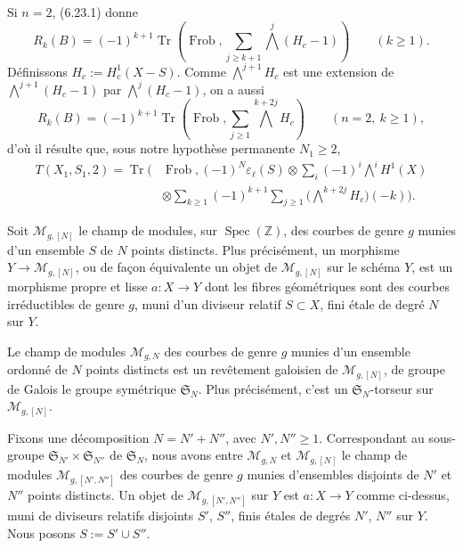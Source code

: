 \documentclass[10pt]{article}
\newcommand{\Z}{\mathbb Z}
\newcommand{\Spec}{\operatorname{Spec}}
\newcommand{\Frob}{\operatorname{Frob}}
\newcommand{\Tr}{\operatorname{Tr}}
\theoremstyle{deligne}
\newcommand{\heading}[1]{\vspace{0.7em}\noindent{\bfseries #1}\quad}
\begin{document}
\heading{Exemple 6.26.} Si $n=2$, (6.23.1) donne
\[
R_k(B)=(-1)^{k+1}\Tr\left(\Frob,\sum_{j\ge k+1}\bigwedge^j(H_c-1)\right)\qquad(k\ge1).
\]
Définissons $H_c:=H^1_c(X-S)$. Comme $\bigwedge^{j+1}H_c$ est une extension de $\bigwedge^{j+1}(H_c-1)$ par $\bigwedge^j(H_c-1)$, on a aussi
\begin{equation}\tag{6.26.1}
R_k(B)=(-1)^{k+1}\Tr\left(\Frob,\sum_{j\ge1}\bigwedge^{k+2j}H_c\right)\qquad(n=2,\ k\ge1),
\end{equation}
d'où il résulte que, sous notre hypothèse permanente $N_1\ge2$,
\begin{equation}\tag{6.26.2}
\begin{aligned}
T(X_1,S_1,2)=\Tr\Bigg(&\Frob,(-1)^N\varepsilon_\ell(S)\otimes
\sum_i(-1)^i\bigwedge^iH^1(X)\\
&\otimes\sum_{k\ge1}(-1)^{k+1}\sum_{j\ge1}\bigl(\bigwedge^{k+2j}H_c\bigr)(-k)\Bigg).
\end{aligned}
\end{equation}

\heading{6.27.} Soit $\mathcal M_{g,[N]}$ le champ de modules, sur $\Spec(\Z)$, des courbes de genre $g$ munies d'un ensemble $S$ de $N$ points distincts. Plus précisément, un morphisme $Y\to\mathcal M_{g,[N]}$, ou de façon équivalente un objet de $\mathcal M_{g,[N]}$ sur le schéma $Y$, est un morphisme propre et lisse $a:X\to Y$ dont les fibres géométriques sont des courbes irréductibles de genre $g$, muni d'un diviseur relatif $S\subset X$, fini \'{e}tale de degré $N$ sur $Y$.

Le champ de modules $\mathcal M_{g,N}$ des courbes de genre $g$ munies d'un ensemble ordonné de $N$ points distincts est un revêtement galoisien de $\mathcal M_{g,[N]}$, de groupe de Galois le groupe symétrique $\mathfrak S_N$. Plus précisément, c'est un $\mathfrak S_N$-torseur sur $\mathcal M_{g,[N]}$.

Fixons une décomposition $N=N'+N''$, avec $N',N''\ge1$. Correspondant au sous-groupe $\mathfrak S_{N'}\times\mathfrak S_{N''}$ de $\mathfrak S_N$, nous avons entre $\mathcal M_{g,N}$ et $\mathcal M_{g,[N]}$ le champ de modules $\mathcal M_{g,[N',N'']}$ des courbes de genre $g$ munies d'ensembles disjoints de $N'$ et $N''$ points distincts. Un objet de $\mathcal M_{g,[N',N'']}$ sur $Y$ est $a:X\to Y$ comme ci-dessus, muni de diviseurs relatifs disjoints $S'$, $S''$, finis \'{e}tales de degrés $N'$, $N''$ sur $Y$. Nous posons $S:=S'\cup S''$.
\end{document}
